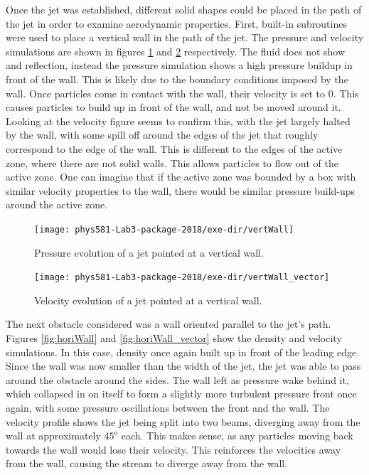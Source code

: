 \documentclass[twocolumn]{article}
\begin{document}
Once the jet was established, different solid shapes could be placed in the path of the jet in order to examine aerodynamic properties. First, built-in subroutines were used to place a vertical wall in the path of the jet. The pressure and velocity simulations are shown in figures \ref{fig:vertWall} and \ref{fig:vertWall_vector} respectively. The fluid does not show and reflection, instead the pressure simulation shows a high pressure buildup in front of the wall. This is likely due to the boundary conditions imposed by the wall. Once particles come in contact with the wall, their velocity is set to $0$. This causes particles to build up in front of the wall, and not be moved around it. Looking at the velocity figure seems to confirm this, with the jet largely halted by the wall, with some spill off around the edges of the jet that roughly correspond to the edge of the wall. This is different to the edges of the active zone, where there are not solid walls. This allows particles to flow out of the active zone. One can imagine that if the active zone was bounded by a box with similar velocity properties to the wall, there would be similar pressure build-ups around the active zone.

\begin{figure}
\centering
\texttt{[image: phys581-Lab3-package-2018/exe-dir/vertWall]}
\caption{Pressure evolution of a jet pointed at a vertical wall.}
\label{fig:vertWall}
\end{figure}

\begin{figure}
\centering
\texttt{[image: phys581-Lab3-package-2018/exe-dir/vertWall\_vector]}
\caption{Velocity evolution of a jet pointed at a vertical wall.}
\label{fig:vertWall_vector}
\end{figure}

The next obstacle considered was a wall oriented parallel to the jet's path. Figures \ref{fig:horiWall} and \ref{fig:horiWall_vector} show the density and velocity simulations. In this case, density once again built up in front of the leading edge. Since the wall was now smaller than the width of the jet, the jet was able to pass around the obstacle around the sides. The wall left as pressure wake behind it, which collapsed in on itself to form a slightly more turbulent pressure front once again, with some pressure oscillations between the front and the wall. The velocity profile shows the jet being split into two beams, diverging away from the wall at approximately $45^o$ each. This makes sense, as any particles moving back towards the wall would lose their velocity. This reinforces the velocities away from the wall, causing the stream to diverge away from the wall.
\end{document}

